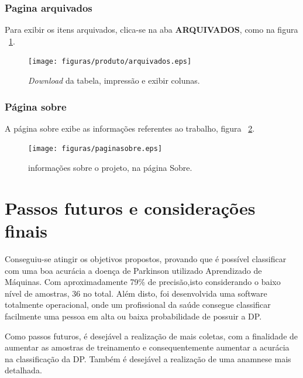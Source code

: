 \subsubsection{Pagina arquivados}
Para exibir os itens arquivados, clica-se na aba \textbf{ARQUIVADOS}, como na figura ~\ref{farquivados}.
\begin{figure}[!htb]
    \centering
    \texttt{[image: figuras/produto/arquivados.eps]}
    \caption{\textit{Download} da tabela, impressão e exibir colunas.}
    \label{farquivados}
\end{figure}

\subsubsection{Página sobre}
A página sobre exibe as informações referentes ao trabalho, figura ~\ref{fsobre}.
\begin{figure}[!htb]
    \centering
    \texttt{[image: figuras/paginasobre.eps]}
    \caption{informações sobre o projeto, na página Sobre.}
    \label{fsobre}
\end{figure}

\section{Passos futuros e considerações finais}
   Conseguiu-se atingir os objetivos propostos, provando que é possível classificar com uma boa acurácia a doença de Parkinson utilizado Aprendizado de Máquinas. Com aproximadamente 79\% de precisão,isto considerando o baixo nível de amostras, 36 no total. Além disto, foi desenvolvida uma software totalmente operacional, onde um profissional da saúde consegue classificar facilmente uma pessoa em alta ou baixa probabilidade de possuir a DP.

   Como passos futuros, é desejável a realização de mais coletas, com a finalidade de aumentar as amostras de treinamento e consequentemente aumentar a acurácia na classificação da DP. Também é desejável a realização de uma anamnese mais detalhada.
